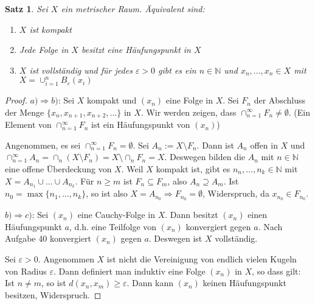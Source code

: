 \documentclass[10pt,a4paper]{report}
\newtheorem{satz}{Satz}
\begin{document}
\begin{satz}
  Sei $X$ ein metrischer Raum.
  Äquivalent sind:
  \begin{enumerate}[label={\alph*)}]
  \item $X$ ist kompakt
  \item Jede Folge in $X$ besitzt eine Häufungspunkt in $X$
  \item $X$ ist vollständig und für jedes $\varepsilon > 0$ gibt es ein $n \in \mathbb{N}$ und $x_{n}, \dots, x_{n} \in X$ mit $X = \cup_{i = 1}^{n} B_{\varepsilon}(x_{i})$
  \end{enumerate}
\end{satz}

\begin{proof}
  $a) \Rightarrow b)$: Sei $X$ kompakt und $(x_{n})$ eine Folge in $X$.
  Sei $F_{n}$ der Abschluss der Menge $\{ x_{n}, x_{n + 1}, x_{n + 2}, \dots \}$ in $X$.
  Wir werden zeigen, dass $\cap_{n = 1}^{\infty} F_{n} \ne \emptyset$.
  (Ein Element von $\cap_{n = 1}^{\infty} F_{n}$ ist ein Häufungspunkt von $(x_{n})$)

  Angenommen, es sei $\cap_{n = 1}^{\infty} F_{n} = \emptyset$.
  Sei $A_{n} := X \setminus F_{n}$.
  Dann ist $A_{n}$ offen in $X$ und $\cap_{n = 1}^{\infty} A_{n} = \cap_{n} (X \setminus F_{n}) = X \setminus \cap_{n} F_{n} = X$.
  Deswegen bilden die $A_{n}$ mit $n \in \mathbb{N}$ eine offene Überdeckung von $X$.
  Weil $X$ kompakt ist, gibt es $n_{n}, \dots, n_{k} \in \mathbb{N}$ mit $X = A_{n_{1}} \cup \dots \cup A_{n_{k}}$.
  Für $n \ge m$ ist $F_{n} \subseteq F_{m}$, also $A_{n} \supseteq A_{m}$.
  Ist $n_{0} = \max \{ n_{1}, \dots, n_{k} \}$, so ist also $X = A_{n_{0}} \Rightarrow F_{n_{0}} = \emptyset$, Widerspruch, da $x_{n_{0}} \in F_{n_{0}}$.

  $b) \Rightarrow c)$: Sei $(x_{n})$ eine Cauchy-Folge in $X$.
  Dann besitzt $(x_{n})$ einen Häufungspunkt $a$, d.h. eine Teilfolge von $(x_{n})$ konvergiert gegen $a$.
  Nach Aufgabe 40 konvergiert $(x_{n})$ gegen $a$.
  Deswegen ist $X$ vollständig.

  Sei $\varepsilon > 0$.
  Angenommen $X$ ist nicht die Vereinigung von endlich vielen Kugeln von Radius $\varepsilon$.
  Dann definiert man induktiv eine Folge $(x_{n})$ in $X$, so dass gilt: Ist $n \ne m$, so ist $d(x_{n}, x_{m}) \ge \varepsilon$.
  Dann kann $(x_{n})$ keinen Häufungspunkt besitzen, Widerspruch.


\end{proof}
\end{document}
